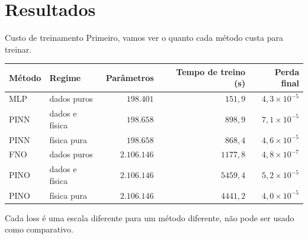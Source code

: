 \section{Resultados}

\begin{frame}{Custo de treinamento}
  Primeiro, vamos ver o quanto cada método custa para treinar.
  \vspace{4pt}
  \begin{center}
    \begin{tabular}{@{}llrrr@{}}
      \toprule
      \textbf{Método} & \textbf{Regime} & \textbf{Parâmetros} & \textbf{Tempo de treino (s)} & \textbf{Perda final} \\
      \midrule
      MLP  & dados puros      & $198.401$   & $151{,}9$  & $4{,}3 \times 10^{-5}$ \\
      PINN & dados e física   & $198.658$   & $898{,}9$  & $7{,}1 \times 10^{-5}$ \\
      PINN & física pura      & $198.658$   & $868{,}4$  & $4{,}6 \times 10^{-5}$ \\
      FNO  & dados puros      & $2.106.146$ & $1177{,}8$ & $4{,}8 \times 10^{-7}$ \\
      PINO & dados e física   & $2.106.146$ & $5459{,}4$ & $5{,}2 \times 10^{-5}$ \\
      PINO & física pura      & $2.106.146$ & $4441{,}2$ & $4{,}0 \times 10^{-5}$ \\
      \bottomrule
    \end{tabular}
  \end{center}
  \vspace{2pt}
  \begin{information}[Observação]
    Cada loss é uma escala diferente para um método diferente, não pode ser usado como comparativo.
  \end{information}
\end{frame}

